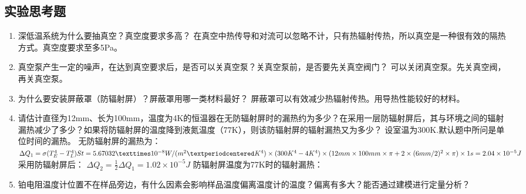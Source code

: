 \documentclass{spaexp}
\begin{document}
        \subsection{实验思考题}
            \begin{ans}
                \begin{enumerate}
                    \item 深低温系统为什么要抽真空？真空度要求多高？
                        在真空中热传导和对流可以忽略不计，只有热辐射传热，所以真空是一种很有效的隔热方式。真空度要求至多5Pa。
                    \item 真空泵产生一定的噪声，在达到真空要求后，是否可以关真空泵？关真空泵前，是否要先关真空阀门？
                        可以关闭真空泵。先关真空阀，再关真空泵。
                    \item 为什么要安装屏蔽罩（防辐射屏）？屏蔽罩用哪一类材料最好？
                        屏蔽罩可以有效减少热辐射传热。用导热性能较好的材料。
                    \item 请估计直径为12mm、长为100mm，温度为4K的恒温器在无防辐射屏时的漏热约为多少？在采用一层防辐射屏后，其与环境之间的辐射漏热减少了多少？如果将防辐射屏的温度降到液氮温度（77K），则该防辐射屏的辐射漏热又为多少？
                        设室温为300K.默认题中所问是单位时间的漏热。
                        无防辐射屏的漏热为：
                        $\Delta Q_1 = \sigma(T_E^4 - T_L^4)St \\= 5.67032×10^{-8}W/(m^2·K^4)\times(300K^4-4K^4)\times(12mm\times100mm\times\pi+2\times(6mm/2)^2\times\pi)\times1s \\= 2.04\times10^{-5}J$
                        采用防辐射屏后：
                        $\Delta Q_2 =\frac12\Delta Q_1 = 1.02\times10^{-5}J$
                        防辐射屏温度为77K时的辐射漏热：
   
                    \item 铂电阻温度计位置不在样品旁边，有什么因素会影响样品温度偏离温度计的温度？偏离有多大？能否通过建模进行定量分析？
                \end{enumerate}
            \end{ans}
\end{document}
